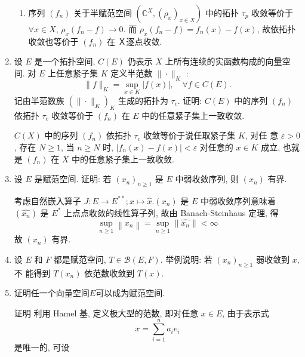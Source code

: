 \begin{enumerate}
\begin{answer}
\begin{enumerate}
                \item 序列 $\left(f_{n}\right)$ 关于半赋范空间 $\left(\mathbb{C}^{X},\left(\rho_{x}\right)_{x \in X}\right)$ 中的拓扑 $\tau_{p}$ 收敛等价于 $\forall x \in X$, $\rho_{x}\left(f_{n}-f\right) \rightarrow 0$. 而 $\rho_{x}\left(f_{n}-f\right)=f_{n}(x)-f(x)$, 故依拓扑收敛也等价于 $\left(f_{n}\right)$ 在 Ｘ逐点收敛.\qedhere
            \end{enumerate}
        \end{answer}
    \item 设 $E$ 是一个拓扑空间, $C(E)$ 仍表示 $X$ 上所有连续的实函数构成的向量空间. 对 $E$ 上任意紧子集 $K$ 定义半范数 $\|\cdot\|_{K}$ :
    \[
    \|f\|_{K}=\sup _{x \in K}|f(x)|, \quad \forall f \in C(E).
    \]
    记由半范数族 $\left(\|\cdot\|_{K}\right)_{K}$ 生成的拓扑为 $\tau_{c}$. 证明: $C(E)$ 中的序列 $\left(f_{n}\right)$ 依拓扑 $\tau_{c}$ 收敛等价于 $\left(f_{n}\right)$ 在 $E$ 中的任意紧子集上一致收敛.
        \begin{answer}
            $C(X)$ 中的序列 $\left(f_{n}\right)$ 依拓扑 $\tau_{c}$ 收敛等价于说任取紧子集 $K$, 对任 意 $\varepsilon>0$, 存在 $N \geq 1$, 当 $n \geq N$ 时, $\left|f_{n}(x)-f(x)\right|<\varepsilon$ 对任意的 $x \in K$ 成立, 也就是 $\left(f_{n}\right)$ 在 $X$ 中的任意紧子集上一致收敛.
        \end{answer}
    \item 设 $E$ 是赋范空间. 证明: 若 $\left(x_{n}\right)_{n \geq 1}$ 是 $E$ 中弱收敛序列, 则 $\left(x_{n}\right)$ 有界.
        \begin{answer}
            考虑自然嵌入算子 $J: E \rightarrow E^{* *} ; x \mapsto \hat{x} .\left(x_{n}\right)$ 是 $E$ 中弱收敛序列意味着 $\left(\widehat{x_{n}}\right)$ 是 $E^{*}$ 上点点收敛的线性算子列, 故由 Banach-Steinhaus 定理, 得
            \[
                \sup _{n \geq 1}\left\|x_{n}\right\|=\sup _{n \geq 1}\left\|\widehat{x_{n}}\right\|<\infty
            \]
            故 $\left(x_{n}\right)$ 有界.
        \end{answer}
    \item 设 $E$ 和 $F$ 都是赋范空问, $T \in \mathcal{B}(E, F)$. 举例说明: 若 $\left(x_{n}\right)_{n \geq 1}$ 弱收敛到 $x$, 不 能得到 $T\left(x_{n}\right)$ 依范数收敛到 $T(x)$.
    \item 证明任一个向量空间$E$可以成为赋范空间. 
        \begin{answer}
            证明 利用 Hamel 基, 定义极大型的范数, 即对任意 $x \in E$, 由于表示式
            \[
                x=\sum_{i=1}^{n} a_{i} e_{i}
            \]
            是唯一的, 可设

\end{answer}
\end{enumerate}
